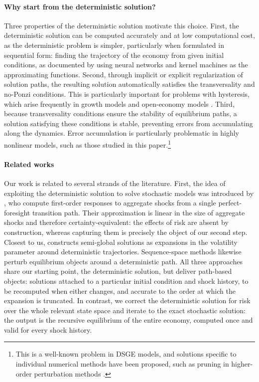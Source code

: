 \documentclass[12pt]{article}
\begin{document}
\paragraph{Why start from the deterministic solution?} Three properties of the deterministic solution motivate this choice. First, the deterministic solution can be computed accurately and at low computational cost, as the deterministic problem is simpler, particularly when formulated in sequential form: finding the trajectory of the economy from given initial conditions, as documented by \citet{kahou2024spooky, kahou2026kernel} using neural networks and kernel machines as the approximating functions.  Second, through implicit or explicit regularization of solution paths, the resulting solution automatically satisfies the transversality and no-Ponzi conditions. This is particularly important for problems with hysteresis, which arise frequently in growth models \citep{skiba1978optimal, azariadis1990threshold} and open-economy models \citep{mendoza2010sudden, mendoza2020fipit}. Third, because transversality conditions ensure the stability of equilibrium paths, a solution satisfying these conditions is stable, preventing errors from accumulating along the dynamics. Error accumulation is particularly problematic in highly nonlinear models, such as those studied in this paper.\footnote{This is a well-known problem in DSGE models, and solutions specific to individual numerical methods have been proposed, such as pruning in higher-order perturbation methods \citep{kim2008calculating, andreasen2018pruned}.}

\paragraph{Related works} Our work is related to several strands of the
literature. First, the idea of exploiting the deterministic solution to solve
stochastic models was introduced by \citet{boppart2018exploiting}, who compute
first-order responses to aggregate shocks from a single perfect-foresight
transition path. Their approximation is linear in the size of aggregate shocks
and therefore certainty-equivalent: the effects of risk are absent by
construction, whereas capturing them is precisely the object of our second
step. Closest to us, \citet{ajevskis2017semiglobal} constructs semi-global
solutions as expansions in the volatility parameter around deterministic
trajectories. Sequence-space methods
\citep{auclert2021sequence} likewise perturb equilibrium objects around a
deterministic path. All three approaches share our starting point, the deterministic solution,
but deliver path-based objects: solutions attached to a particular initial condition and
shock history, to be recomputed when either changes, and accurate to the order
at which the expansion is truncated. In contrast, we correct the deterministic
solution for risk over the whole relevant state space and iterate to the exact
stochastic solution: the output is the recursive equilibrium of the entire
economy, computed once and valid for every shock history.
\end{document}
